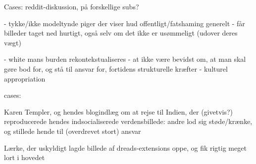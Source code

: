     Cases: reddit-diskussion, på forskellige subs?


- tykke/ikke modeltynde piger der viser hud offentligt/fatshaming generelt
    - får billeder taget ned hurtigt, også selv om det ikke er usømmeligt
    (udover deres vægt)

- white mans burden rekontekstualiseres
    - at ikke være bevidst om, at man skal gøre bod for, og stå til ansvar
    for, fortidens strukturelle kræfter
    - kulturel appropriation
    
    cases:
    
    Karen Templer, og hendes blogindlæg om at rejse til Indien, der
    (givetvis?) reproducerede hendes indsocialiserede verdensbillede:
    andre lod sig støde/krænke, og stillede hende til (overdrevet stort)
    ansvar

    Lærke, der uskyldigt lagde billede af dreads-extensions oppe, og fik
    rigtig meget lort i hovedet


